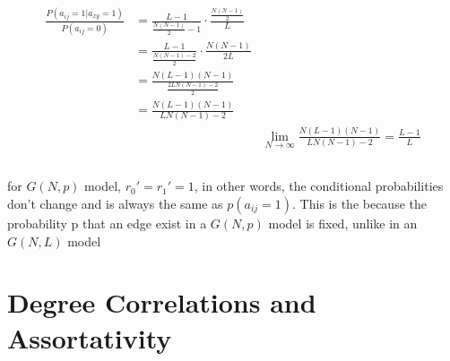 \documentclass {article}
\begin{document}
\begin{align*}
	\frac{P \left( a_{ij} = 1 | a_{xy} = 1 \right)}{P \left( a_{ij}=0 \right)} &=\frac{L-1}{\frac{N(N-1)}{2}-1} \cdot \frac{\frac{N(N-1)}{2}}{L}\\
	&=\frac{L-1}{\frac{N(N-1)-2}{2}} \cdot \frac{N(N-1)}{2L}\\
	&= \frac{N(L-1)(N-1)}{\frac{2LN(N-1)-2}{2}}\\
	&= \frac{N(L-1)(N-1)}{LN(N-1)-2}\\
	&&\lim\limits_{N \to \infty}  \frac{N(L-1)(N-1)}{LN(N-1)-2} = \frac{L-1}{L}
\end{align*}

\subsection{}
for $G(N,p)$ model, $r_0' = r_1' = 1$, in other words, the conditional probabilities don't change and is always the same as $p(a_{ij} = 1)$.
This is the because the probability p that an edge exist  in a $G(N,p)$ model is fixed, unlike in an $G(N,L)$ model

\subsection{}
\newpage




\section{Degree Correlations and Assortativity}
\end{document}
